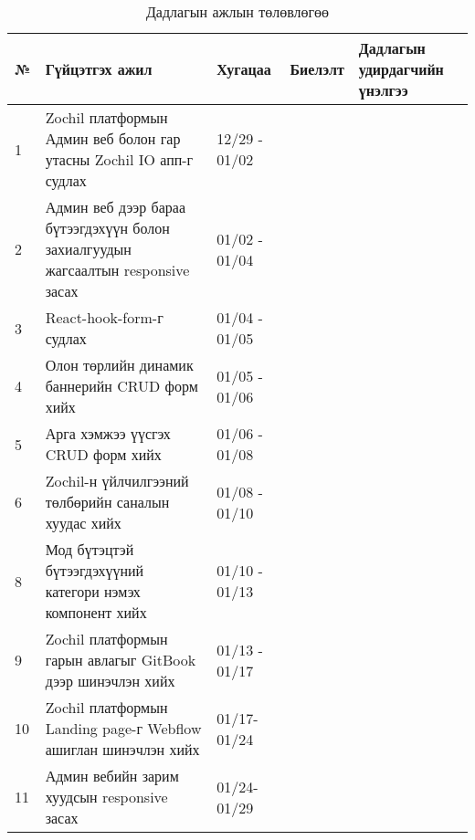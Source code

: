 \begin{table}[h]
	\caption{Дадлагын ажлын төлөвлөгөө}
	\begin{tabular}{|p{0.5cm}|p{8cm}|l|l|p{3cm}|}
	\hline
	\textbf{№} & \textbf{Гүйцэтгэх ажил} & \textbf{Хугацаа} & \textbf{Биелэлт} & \textbf{Дадлагын удирдагчийн үнэлгээ} \\ \hline
	1 & Zochil платформын Админ веб болон гар утасны Zochil IO апп-г судлах & 12/29 - 01/02 && \\ \hline
	2 & Админ веб дээр бараа бүтээгдэхүүн болон захиалгуудын жагсаалтын responsive засах & 01/02 - 01/04 && \\ \hline
	3 & React-hook-form-г судлах & 01/04 - 01/05 && \\ \hline
	4 &  Олон төрлийн динамик баннерийн CRUD форм хийх  & 01/05 - 01/06 && \\ \hline
	5 &  Арга хэмжээ үүсгэх CRUD форм хийх & 01/06 - 01/08 && \\ \hline
	6 & Zochil-н үйлчилгээний төлбөрийн саналын хуудас хийх & 01/08 - 01/10 && \\ \hline
	8 & Мод бүтэцтэй бүтээгдэхүүний категори нэмэх компонент хийх  & 01/10 - 01/13 && \\ \hline
   9 & Zochil платформын гарын авлагыг GitBook дээр шинэчлэн хийх  & 01/13 - 01/17 && \\ \hline
   10 & Zochil платформын Landing page-г Webflow ашиглан шинэчлэн хийх & 01/17- 01/24 && \\ \hline
   11 & Админ вебийн зарим хуудсын responsive засах & 01/24- 01/29 && \\ \hline

	\end{tabular}
\end{table}